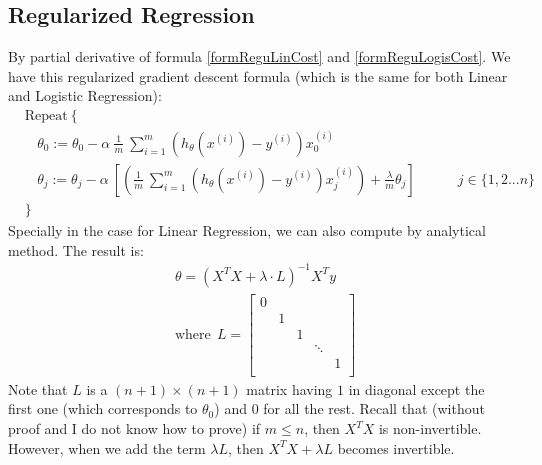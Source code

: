 \subsection{Regularized Regression}
By partial derivative of formula \eqref{formReguLinCost} and \eqref{formReguLogisCost}. We have this regularized gradient descent formula (which is the same for both Linear and Logistic Regression):
\begin{align}
& \text{Repeat}\ \lbrace \nonumber \\
& \ \ \ \ \theta_0 := \theta_0 - \alpha\ \frac{1}{m}\ \sum_{i=1}^m (h_\theta(x^{(i)}) - y^{(i)})x_0^{(i)} \\
& \ \ \ \ \theta_j := \theta_j - \alpha\ \left[ \left( \frac{1}{m}\ \sum_{i=1}^m (h_\theta(x^{(i)}) - y^{(i)})x_j^{(i)} \right) + \frac{\lambda}{m}\theta_j \right] &\ \ \ \ \ \ \ \ \ \ j \in \lbrace 1,2...n\rbrace \nonumber\\
& \rbrace \nonumber
\end{align} 
Specially in the case for Linear Regression, we can also compute by analytical method. The result is:
\begin{align*}
& \theta = \left( X^TX + \lambda \cdot L \right)^{-1} X^Ty \\
& \text{where}\ \ L = 
\begin{bmatrix}
 0 & & & & \\
 & 1 & & & \\
 & & 1 & & \\
 & & & \ddots & \\
 & & & & 1 \\
\end{bmatrix}
\end{align*}
Note that $L$ is a $(n+1) \times (n+1)$ matrix having $1$ in diagonal except the first one (which corresponds to $\theta_0$) and $0$ for all the rest. Recall that (without proof and I do not know how to prove) if $ m \leq n$, then $X^TX$ is non-invertible. However, when we add the term $\lambda L$, then $X^TX + \lambda L$ becomes invertible.